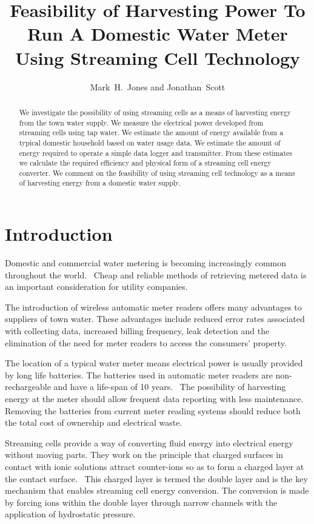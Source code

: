 \documentclass[10pt,final,journal]{IEEEtran}
\title{Feasibility of Harvesting Power To Run A Domestic Water Meter Using Streaming Cell Technology}
\author{Mark~H.~Jones and Jonathan~Scott}
\begin{document}
    \maketitle

    \begin{abstract}
        We investigate the possibility of using streaming cells as a means of harvesting energy from the town water supply.
        We measure the electrical power developed from streaming cells using tap water.
        We estimate the amount of energy available from a typical domestic household based on water usage data.
        We estimate the amount of energy required to operate a simple data logger and transmitter.
        From these estimates we calculate the required efficiency and physical form of a streaming cell energy converter.
        We comment on the feasibility of using streaming cell technology as a means of harvesting energy from a domestic water supply.
    \end{abstract}

    \section{Introduction}
    Domestic and commercial water metering is becoming increasingly common throughout the world.~\cite{Chang2012}
    Cheap and reliable methods of retrieving metered data is an important consideration for utility companies.

    The introduction of wireless automatic meter readers offers many advantages to suppliers of town water.
    These advantages include reduced error rates associated with collecting data, increased billing frequency, leak detection and the elimination of the need for meter readers to access the consumers' property.~\cite{Chang2012,Britton2013}

    The location of a typical water meter means electrical power is usually provided by long life batteries.
    The batteries used in automatic meter readers are non-rechargeable and have a life-span of 10 years.~\cite{BMeters2014}
    The possibility of harvesting energy at the meter should allow frequent data reporting with less maintenance.
    Removing the batteries from current meter reading systems should reduce both the total cost of ownership and electrical waste.

    Streaming cells provide a way of converting fluid energy into electrical energy without moving parts.
    They work on the principle that charged surfaces in contact with ionic solutions attract counter-ions so as to form a charged layer at the contact surface.~\cite{Stein2004}
    This charged layer is termed the double layer and is the key mechanism that enables streaming cell energy conversion.
    The conversion is made by forcing ions within the double layer through narrow channels with the application of hydrostatic pressure.
\end{document}
